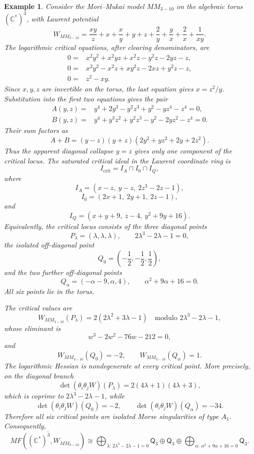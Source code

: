 \documentclass[11pt]{amsart}
\newtheorem{example}{Example}[section]
\newcommand{\MorseCat}[1]{\mathsf{Q}_{#1}}
\begin{document}
\begin{example}
Consider the Mori--Mukai model $MM_{3-10}$ on the algebraic torus
$(\mathbb{C}^*)^3$, with Laurent potential
\[
W_{MM_{3-10}}=\frac{xy}{z}+x+\frac{x}{y}+y+z+
\frac{2}{y}+\frac{y}{x}+\frac{2}{x}+\frac{1}{xy}.
\]
The logarithmic critical equations, after clearing denominators, are
\begin{align*}
0={}&x^2y^2+x^2yz+x^2z-y^2z-2yz-z, \\
0={}&x^2y^2-x^2z+xy^2z-2xz+y^2z-z, \\
0={}&z^2-xy.
\end{align*}
Since $x,y,z$ are invertible on the torus, the last equation gives
$x=z^2/y$. Substitution into the first two equations gives the pair
\begin{align*}
A(y,z)={}&y^4+2y^3-y^2z^3+y^2-yz^4-z^4=0, \\
B(y,z)={}&y^4+y^3z^2+y^2z^3-y^2-2yz^2-z^4=0.
\end{align*}
Their sum factors as
\[
A+B=(y-z)(y+z)(2y^2+yz^2+2y+2z^2).
\]
Thus the apparent diagonal collapse $y=z$ gives only one component of the
critical locus. The saturated critical ideal in the Laurent coordinate ring is
\[
I_{\mathrm{crit}}=I_A\cap I_0\cap I_Q,
\]
where
\[
I_A=(x-z,\ y-z,\ 2z^3-2z-1),
\]
\[
I_0=(2x+1,\ 2y+1,\ 2z-1),
\]
and
\[
I_Q=(x+y+9,\ z-4,\ y^2+9y+16).
\]
Equivalently, the critical locus consists of the three diagonal points
\[
P_\lambda=(\lambda,\lambda,\lambda),
\qquad
2\lambda^3-2\lambda-1=0,
\]
the isolated off-diagonal point
\[
Q_0=\left(-\frac12,-\frac12,\frac12\right),
\]
and the two further off-diagonal points
\[
Q_\alpha=(-\alpha-9,\alpha,4),
\qquad
\alpha^2+9\alpha+16=0.
\]
All six points lie in the torus.

The critical values are
\[
W_{MM_{3-10}}(P_\lambda)=2(2\lambda^2+3\lambda-1)
\quad\text{modulo }2\lambda^3-2\lambda-1,
\]
whose eliminant is
\[
w^3-2w^2-76w-212=0,
\]
and
\[
W_{MM_{3-10}}(Q_0)=-2,
\qquad
W_{MM_{3-10}}(Q_\alpha)=1.
\]
The logarithmic Hessian is nondegenerate at every critical point. More
precisely, on the diagonal branch
\[
\det(\theta_i\theta_jW)(P_\lambda)
=2(4\lambda+1)(4\lambda+3),
\]
which is coprime to $2\lambda^3-2\lambda-1$, while
\[
\det(\theta_i\theta_jW)(Q_0)=-2,
\qquad
\det(\theta_i\theta_jW)(Q_\alpha)=-34.
\]
Therefore all six critical points are isolated Morse singularities of type
$A_1$. Consequently,
\[
\overline{MF((\mathbb{C}^*)^3,W_{MM_{3-10}})}
\cong \bigoplus_{\lambda:\,2\lambda^3-2\lambda-1=0}\MorseCat{3} \oplus \MorseCat{3} \oplus \bigoplus_{\alpha:\,\alpha^2+9\alpha+16=0}\MorseCat{3}.
\]
\end{example}
\end{document}
